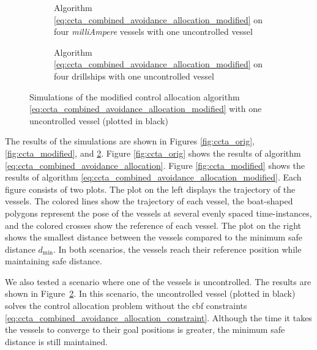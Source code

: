 \begin{figure}[t]
    \centering
    \begin{subfigure}{\linewidth}
        \centering
        
        \vspace{-6mm}
        \caption{Algorithm \eqref{eq:ccta_combined_avoidance_allocation_modified} on four \emph{milliAmpere} vessels with one uncontrolled vessel}
        \vspace{0em}
    \end{subfigure}
    \begin{subfigure}{\linewidth}
        \centering
        
        \vspace{-6mm}
        \caption{Algorithm \eqref{eq:ccta_combined_avoidance_allocation_modified} on four drillships with one uncontrolled vessel}
        \label{fig:ccta_drillship_unc}
        \vspace{-1.5mm}
    \end{subfigure}
    \caption{Simulations of the modified control allocation algorithm \eqref{eq:ccta_combined_avoidance_allocation_modified} with one uncontrolled vessel (plotted in black)}
    \label{fig:ccta_uncontrolled}
\end{figure}

The results of the simulations are shown in Figures \ref{fig:ccta_orig}, \ref{fig:ccta_modified}, and \ref{fig:ccta_uncontrolled}.
Figure \ref{fig:ccta_orig} shows the results of algorithm \eqref{eq:ccta_combined_avoidance_allocation}.
Figure \ref{fig:ccta_modified} shows the results of algorithm \eqref{eq:ccta_combined_avoidance_allocation_modified}.
Each figure consists of two plots.
The plot on the left displays the trajectory of the vessels.
The colored lines show the trajectory of each vessel, the boat-shaped polygons represent the pose of the vessels at several evenly spaced time-instances, and the colored crosses show the reference of each vessel.
The plot on the right shows the smallest distance between the vessels compared to the minimum safe distance $d_{\min}$.
In both scenarios, the vessels reach their reference position while maintaining safe distance.

We also tested a scenario where one of the vessels is uncontrolled.
The results are shown in Figure~\ref{fig:ccta_uncontrolled}.
In this scenario, the uncontrolled vessel (plotted in black) solves the control allocation problem without the \gls{cbf} constraints \eqref{eq:ccta_combined_avoidance_allocation_constraint}.
Although the time it takes the vessels to converge to their goal positions is greater, the minimum safe distance is still maintained.

